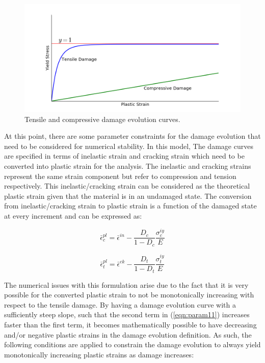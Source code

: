 \begin{figure}[!htb]
\begin{center}
\includegraphics[width=\textwidth]{figures/Chapter3/DamageCurves}
\caption{{\label{fig:damageCurves} Tensile and compressive damage evolution curves.%
}}
\end{center}
\end{figure}

At this point, there are some parameter constraints for the damage evolution that need to be considered for numerical stability. In this model, The damage curves are specified in terms of inelastic strain and cracking strain which need to be converted into plastic strain for the analysis. The inelastic and cracking strains represent the same strain component but refer to compression and tension respectively. This inelastic/cracking strain can be considered as the theoretical plastic strain given that the material is in an undamaged state. The conversion from inelastic/cracking strain to plastic strain is a function of the damaged state at every increment and can be expressed as:

\begin{equation}
\label{eqn:param11}
\bar{\epsilon}_{c}^{pl}=\bar{\epsilon}^{in}-\frac{D_{c}}{1-D_{c}}\frac{\sigma_{c}^{iy}}{E}
\end{equation}

\begin{equation}
\label{eqn:param11-1}
\bar{\epsilon}_{t}^{pl}=\bar{\epsilon}^{ck}-\frac{D_{t}}{1-D_{t}}\frac{\sigma_{t}^{iy}}{E}
\end{equation}

The numerical issues with this formulation arise due to the fact that it is very possible for the converted plastic strain to not be monotonically increasing with respect to the tensile damage. By having a damage evolution curve with a sufficiently steep slope, such that the second term in (\ref{eqn:param11}) increases faster than the first term, it becomes mathematically possible to have decreasing and/or negative plastic strains in the damage evolution definition. As such, the following conditions are applied to constrain the damage evolution to always yield monotonically increasing plastic strains as damage increases:

